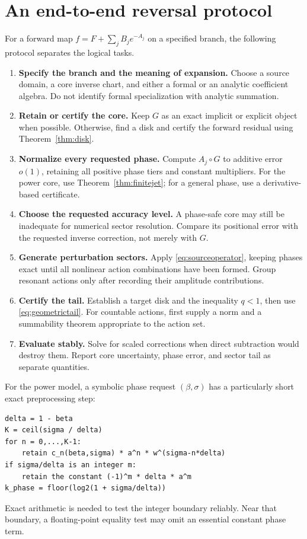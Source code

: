 \documentclass[11pt,a4paper]{article}
\theoremstyle{definition}
\theoremstyle{remark}
\numberwithin{equation}{section}
\begin{document}
\section{An end-to-end reversal protocol}\label{sec:protocol}

For a forward map $f=F+\sum_j B_je^{-A_j}$ on a specified branch, the following protocol separates the logical tasks.
\begin{enumerate}[leftmargin=8mm]
\item \textbf{Specify the branch and the meaning of expansion.} Choose a source domain, a core inverse chart, and either a formal or an analytic coefficient algebra. Do not identify formal specialization with analytic summation.
\item \textbf{Retain or certify the core.} Keep $G$ as an exact implicit or explicit object when possible. Otherwise, find a disk and certify the forward residual using Theorem~\ref{thm:disk}.
\item \textbf{Normalize every requested phase.} Compute $A_j\circ G$ to additive error $o(1)$, retaining all positive phase tiers and constant multipliers. For the power core, use Theorem~\ref{thm:finitejet}; for a general phase, use a derivative-based certificate.
\item \textbf{Choose the requested accuracy level.} A phase-safe core may still be inadequate for numerical sector resolution. Compare its positional error with the requested inverse correction, not merely with $G$.
\item \textbf{Generate perturbation sectors.} Apply \eqref{eq:sourceoperator}, keeping phases exact until all nonlinear action combinations have been formed. Group resonant actions only after recording their amplitude contributions.
\item \textbf{Certify the tail.} Establish a target disk and the inequality $q<1$, then use \eqref{eq:geometrictail}. For countable actions, first supply a norm and a summability theorem appropriate to the action set.
\item \textbf{Evaluate stably.} Solve for scaled corrections when direct subtraction would destroy them. Report core uncertainty, phase error, and sector tail as separate quantities.
\end{enumerate}

For the power model, a symbolic phase request $(\beta,\sigma)$ has a particularly short exact preprocessing step:
\begin{verbatim}
delta = 1 - beta
K = ceil(sigma / delta)
for n = 0,...,K-1:
    retain c_n(beta,sigma) * a^n * w^(sigma-n*delta)
if sigma/delta is an integer m:
    retain the constant (-1)^m * delta * a^m
k_phase = floor(log2(1 + sigma/delta))
\end{verbatim}
Exact arithmetic is needed to test the integer boundary reliably. Near that boundary, a floating-point equality test may omit an essential constant phase term.
\end{document}
